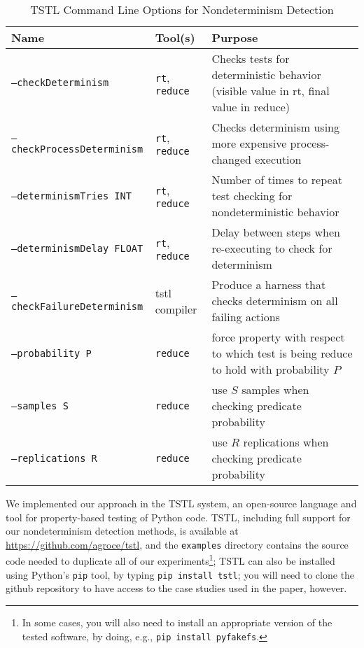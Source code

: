 \begin{table*}
\centering
{\scriptsize
\caption{TSTL Command Line Options for
  Nondeterminism Detection}
\label{tab:options}
\begin{tabular}{l|l|l}
Name &  Tool(s) & Purpose \\
\hline
\hline
{\tt --checkDeterminism} & {\tt rt}, {\tt reduce} & Checks tests for deterministic
                                  behavior (visible value in rt, final
  value in reduce)\\
\hline
{\tt --checkProcessDeterminism} & {\tt rt}, {\tt reduce} & Checks determinism using more 
                                         expensive process-changed 
                                         execution \\
\hline
{\tt --determinismTries INT} & {\tt rt}, {\tt reduce} & Number of times to repeat test 
                                  checking for nondeterministic
                                  behavior \\
\hline 
{\tt --determinismDelay FLOAT} & {\tt rt}, {\tt reduce} & Delay between steps when 
                                  re-executing to check for
                                              determinism \\
\hline 
{\tt --checkFailureDeterminism} & tstl compiler & Produce a harness
                                                  that checks
                                                  determinism on all
                                                  failing actions \\
\hline 
{\tt --probability P} & {\tt reduce} & force property with respect to which 
                               test is being reduce to hold with 
                                 probability $P$ \\
\hline 
{\tt --samples S} & {\tt reduce} & use $S$ samples when checking predicate
                             probability\\
\hline 
{\tt --replications R} & {\tt reduce} & use $R$ replications when checking predicate probability\\
\hline
\hline

\end{tabular}
}
\end{table*}

We implemented our approach in the TSTL \cite{NFM15,ISSTA15,tstlsttt}
system, an open-source
language and tool for property-based testing
\cite{Hypothesis,ClaessenH00} of Python code.   TSTL, including full
support for our nondeterminism detection methods, is available at
\url{https://github.com/agroce/tstl}, and the {\tt examples} directory
contains the source code needed to duplicate all of our
experiments\footnote{In some cases, you will also need to install an
  appropriate version of the tested software, by doing, e.g., {\tt pip
    install pyfakefs}.};
TSTL can also be installed using Python's {\tt pip} tool, by typing
{\tt pip install tstl}; you will need to clone the github repository
to have access to the case studies used in the paper, however.

